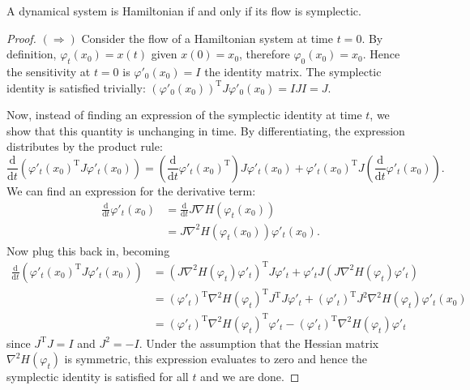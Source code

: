\begin{theorem}
\label{thm:hamil}
A dynamical system is Hamiltonian if and only if its flow is symplectic.
\end{theorem}
\begin{proof}
$(\Rightarrow)$ Consider the flow of a Hamiltonian system at time $t=0$. By definition, $\varphi_t(x_0) = x(t)$ given $x(0) = x_0$,
therefore $\varphi_0(x_0) = x_0$. Hence the sensitivity at $t=0$ is $\varphi'_0(x_0) = I$ the identity matrix.
The symplectic identity is satisfied trivially: $(\varphi'_0(x_0))^\mathrm{T} J \varphi'_0(x_0) = IJI = J$.

Now, instead of finding an expression of the symplectic identity at time $t$,
we show that this quantity is unchanging in time.
By differentiating, the expression distributes by the product rule:
\begin{equation*}
	\frac{\mathrm{d}}{\mathrm{d}t} \left(
		\varphi'_t(x_0)^\mathrm{T} J \varphi'_t(x_0)
	\right) = \left(
		\frac{\mathrm{d}}{\mathrm{d}t} \varphi'_t(x_0)^\mathrm{T}
	\right) J \varphi'_t(x_0) + \varphi'_t(x_0)^\mathrm{T} J \left(
		\frac{\mathrm{d}}{\mathrm{d}t} \varphi'_t(x_0)
	\right).
\end{equation*}
We can find an expression for the derivative term:
\begin{align*}
	\frac{\mathrm{d}}{\mathrm{d}t} \varphi'_t(x_0) &= \frac{\mathrm{d}}{\mathrm{d}t} J \nabla H(\varphi_t(x_0)) \\
	&= J \nabla^2 H(\varphi_t(x_0)) \varphi'_t(x_0).
\end{align*}
Now plug this back in, becoming
\begin{align*}
	\frac{\mathrm{d}}{\mathrm{d}t} \left(
		\varphi'_t(x_0)^\mathrm{T} J \varphi'_t(x_0)
	\right) &= \left( J \nabla^2 H(\varphi_t)\varphi'_t \right)^\mathrm{T} J \varphi'_t 
	+ \varphi'_t J \left( 
		J \nabla^2 H(\varphi_t) \varphi'_t
  	\right) \\
	&= (\varphi'_t)^\mathrm{T} \nabla^2 H(\varphi_t)^\mathrm{T} J^\mathrm{T} J \varphi'_t
	+ (\varphi'_t)^\mathrm{T} J^2 \nabla^2 H(\varphi_t) \varphi'_t(x_0) \\
	&= (\varphi'_t)^\mathrm{T} \nabla^2 H(\varphi_t)^\mathrm{T} \varphi'_t - (\varphi'_t)^\mathrm{T} \nabla^2 H(\varphi_t) \varphi'_t
\end{align*}
since $J^\mathrm{T}J = I$ and $J^2 = -I$.
Under the assumption that the Hessian matrix $\nabla^2 H(\varphi_t)$ is symmetric,
this expression evaluates to zero and hence the symplectic identity is satisfied for all $t$ and we are done.


\end{proof}
